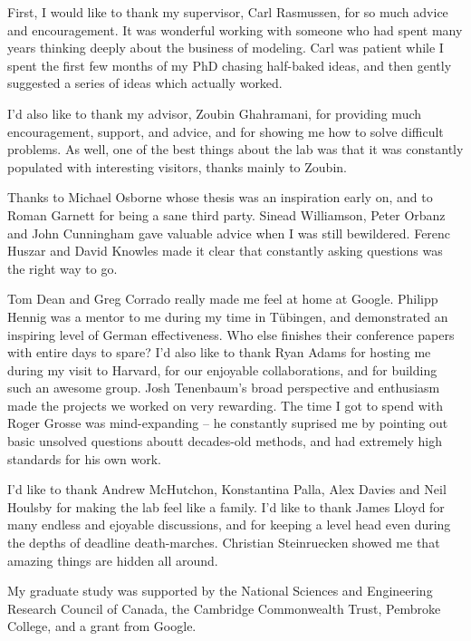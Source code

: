 
\begin{acknowledgements}      


First, I would like to thank my supervisor, Carl Rasmussen, for so much advice and encouragement.
It was wonderful working with someone who had spent many years thinking deeply about the business of modeling.
Carl was patient while I spent the first few months of my PhD chasing half-baked ideas, and then gently suggested a series of ideas which actually worked.

I'd also like to thank my advisor, Zoubin Ghahramani, for providing much encouragement, support, and advice, and for showing me how to solve difficult problems.
As well, one of the best things about the lab was that it was constantly populated with interesting visitors, thanks mainly to Zoubin.

Thanks to Michael Osborne whose thesis was an inspiration early on, and to Roman Garnett for being a sane third party.
Sinead Williamson, Peter Orbanz and John Cunningham gave valuable advice when I was still bewildered.
Ferenc Huszar and David Knowles made it clear that constantly asking questions was the right way to go.

Tom Dean and Greg Corrado really made me feel at home at Google.
Philipp Hennig was a mentor to me during my time in T\"{u}bingen, and demonstrated an inspiring level of German effectiveness.
Who else finishes their conference papers with entire days to spare?
I'd also like to thank Ryan Adams for hosting me during my visit to Harvard, for our enjoyable collaborations, and for building such an awesome group.
Josh Tenenbaum's broad perspective and enthusiasm made the projects we worked on very rewarding.
The time I got to spend with Roger Grosse was mind-expanding -- he constantly suprised me by pointing out basic unsolved questions aboutt decades-old methods, and had extremely high standards for his own work.

I'd like to thank Andrew McHutchon, Konstantina Palla, Alex Davies and Neil Houlsby for making the lab feel like a family.
I'd like to thank James Lloyd for many endless and ejoyable discussions, and for keeping a level head even during the depths of deadline death-marches.
Christian Steinruecken showed me that amazing things are hidden all around.

My graduate study was supported by the National Sciences and Engineering Research Council of Canada, the Cambridge Commonwealth Trust, Pembroke College, and a grant from Google.

\end{acknowledgements}
